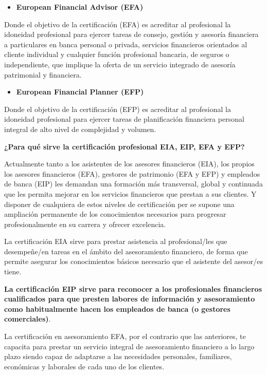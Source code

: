 \documentclass[
  letterpaper,
  DIV=11,
  numbers=noendperiod]{scrreprt}
\begin{document}
\begin{itemize}
\item
  \textbf{European Financial Advisor (EFA)}
\end{itemize}

Donde el objetivo de la certificación (EFA) es acreditar al profesional
la idoneidad profesional para ejercer tareas de consejo, gestión y
asesoría financiera a particulares en banca personal o privada,
servicios financieros orientados al cliente individual y cualquier
función profesional bancaria, de seguros o independiente, que implique
la oferta de un servicio integrado de asesoría patrimonial y financiera.

\begin{itemize}
\item
  \textbf{European Financial Planner (EFP)}
\end{itemize}

Donde el objetivo de la certificación (EFP) es acreditar al profesional
la idoneidad profesional para ejercer tareas de planificación financiera
personal integral de alto nivel de complejidad y volumen.

\textbf{¿Para qué sirve la certificación profesional EIA, EIP, EFA y
EFP?}

Actualmente tanto a los asistentes de los asesores financieros (EIA),
los propios los asesores financieros (EFA), gestores de patrimonio (EFA
y EFP) y empleados de banca (EIP) les demandan una formación más
transversal, global y continuada que les permita mejorar en los
servicios financieros que prestan a sus clientes. Y disponer de
cualquiera de estos niveles de certificación per se supone una
ampliación permanente de los conocimientos necesarios para progresar
profesionalmente en su carrera y ofrecer excelencia.

La certificación EIA sirve para prestar asistencia al profesional/les
que desempeñe/en tareas en el ámbito del asesoramiento financiero, de
forma que permite asegurar los conocimientos básicos necesario que el
asistente del asesor/es tiene.

\textbf{La certificación EIP sirve para reconocer a los profesionales
financieros cualificados para que presten labores de información y
asesoramiento como habitualmente hacen los empleados de banca (o
gestores comerciales)}.

La certificación en asesoramiento EFA, por el contrario que las
anteriores, te capacita para prestar un servicio integral de
asesoramiento financiero a lo largo plazo siendo capaz de adaptarse a
las necesidades personales, familiares, económicas y laborales de cada
uno de los clientes.
\end{document}
